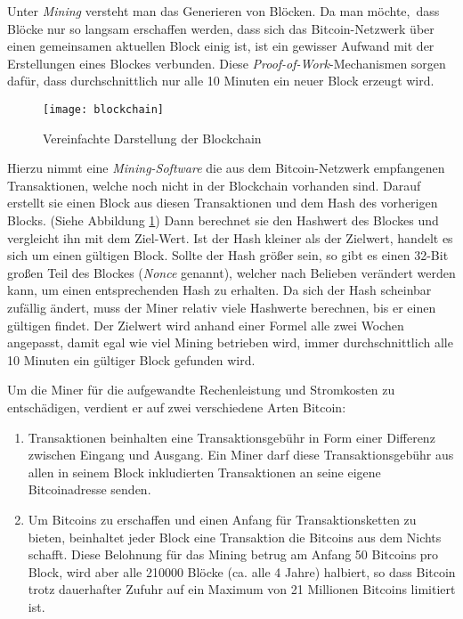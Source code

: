 Unter \emph{Mining} versteht man das Generieren von Blöcken.
Da man möchte, dass Blöcke nur so langsam erschaffen werden, dass sich das Bitcoin-Netzwerk über einen gemeinsamen aktuellen Block einig ist, ist ein gewisser Aufwand mit der Erstellungen eines Blockes verbunden.
Diese \emph{Proof-of-Work}-Mechanismen sorgen dafür, dass durchschnittlich nur alle 10 Minuten ein neuer Block erzeugt wird.

\begin{figure}
    \begin{center}
        \texttt{[image: blockchain]}
        \caption{Vereinfachte Darstellung der Blockchain \parencite[3]{nakamoto}}
        \label{fig:blockchain}
    \end{center}
\end{figure}

Hierzu nimmt eine \emph{Mining-Software} die aus dem Bitcoin-Netzwerk empfangenen Transaktionen, welche noch nicht in der Blockchain vorhanden sind.
Darauf erstellt sie einen Block aus diesen Transaktionen und dem Hash des vorherigen Blocks.
(Siehe Abbildung \ref{fig:blockchain})
Dann berechnet sie den Hashwert des Blockes und vergleicht ihn mit dem Ziel-Wert.
Ist der Hash kleiner als der Zielwert, handelt es sich um einen gültigen Block.
Sollte der Hash größer sein, so gibt es einen 32-Bit großen Teil des Blockes (\emph{Nonce} genannt), welcher nach Belieben verändert werden kann, um einen entsprechenden Hash zu erhalten.
Da sich der Hash scheinbar zufällig ändert, muss der Miner relativ viele Hashwerte berechnen, bis er einen gültigen findet.
Der Zielwert wird anhand einer Formel alle zwei Wochen angepasst, damit egal wie viel Mining betrieben wird, immer durchschnittlich alle 10 Minuten ein gültiger Block gefunden wird.

Um die Miner für die aufgewandte Rechenleistung und Stromkosten zu entschädigen, verdient er auf zwei verschiedene Arten Bitcoin:
\begin{enumerate}
    \item Transaktionen beinhalten eine Transaktionsgebühr in Form einer Differenz zwischen Eingang und Ausgang.
    Ein Miner darf diese Transaktionsgebühr aus allen in seinem Block inkludierten Transaktionen an seine eigene Bitcoinadresse senden.
    \item Um Bitcoins zu erschaffen und einen Anfang für Transaktionsketten zu bieten, beinhaltet jeder Block eine Transaktion die Bitcoins aus dem Nichts schafft.
    Diese Belohnung für das Mining betrug am Anfang 50 Bitcoins pro Block, wird aber alle 210000 Blöcke (ca. alle 4 Jahre) halbiert, so dass Bitcoin trotz dauerhafter Zufuhr auf ein Maximum von 21 Millionen Bitcoins limitiert ist.
\end{enumerate}

